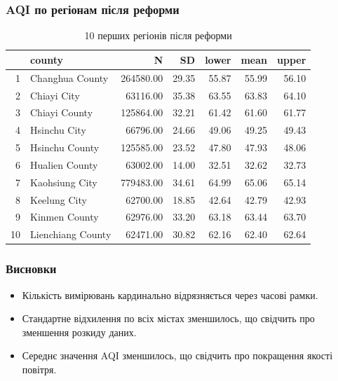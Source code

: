 \documentclass{beamer}
\begin{document}
\begin{frame}
  \frametitle{AQI по регіонам після реформи}

  \begin{table}[ht]
    \centering
    \begin{tabular}{rlrrrrr}
      \hline
    & county & N & SD & lower & mean & upper \\ 
      \hline
    1 & Changhua County & 264580.00 & 29.35 & 55.87 & 55.99 & 56.10 \\ 
      2 & Chiayi City & 63116.00 & 35.38 & 63.55 & 63.83 & 64.10 \\ 
      3 & Chiayi County & 125864.00 & 32.21 & 61.42 & 61.60 & 61.77 \\ 
      4 & Hsinchu City & 66796.00 & 24.66 & 49.06 & 49.25 & 49.43 \\ 
      5 & Hsinchu County & 125585.00 & 23.52 & 47.80 & 47.93 & 48.06 \\ 
      6 & Hualien County & 63002.00 & 14.00 & 32.51 & 32.62 & 32.73 \\ 
      7 & Kaohsiung City & 779483.00 & 34.61 & 64.99 & 65.06 & 65.14 \\ 
      8 & Keelung City & 62700.00 & 18.85 & 42.64 & 42.79 & 42.93 \\ 
      9 & Kinmen County & 62976.00 & 33.20 & 63.18 & 63.44 & 63.70 \\ 
      10 & Lienchiang County & 62471.00 & 30.82 & 62.16 & 62.40 & 62.64 \\ 
    
      \hline
    \end{tabular}
    \caption{10 перших регіонів після реформи} 
    \end{table}
\end{frame}



\begin{frame}
  \frametitle{Висновки}

  \begin{itemize}
    \item Кількість вимірювань кардинально відрязняється через часові рамки.
    \item Стандартне відхилення по всіх містах зменшилось, що свідчить про
    зменшення розкиду даних.
    \item Середнє значення AQI зменшилось, що свідчить про покращення якості повітря.
  \end{itemize}
\end{frame}
\end{document}
